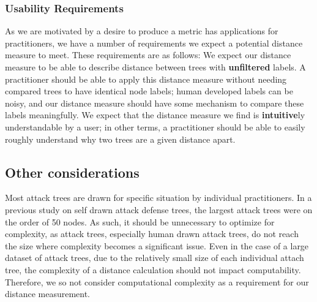 \subsubsection{Usability Requirements}

As we are motivated by a desire to produce a metric has applications for practitioners, we have a number of requirements we expect a potential distance measure to meet. These requirements are as follows:
We expect our distance measure to be able to describe distance between trees with \textbf{unfiltered} labels. A practitioner should be able to apply this distance measure without needing compared trees to have identical node labels; human developed labels can be noisy, and our distance measure should have some mechanism to compare these labels meaningfully. We expect that the distance measure we find is \textbf{intuitive}ly understandable by a user; in other terms, a practitioner should be able to easily roughly understand why two trees are a given distance apart.
















% 



\subsection{Other considerations}

Most attack trees are drawn for specific situation by individual practitioners. In a previous study on self drawn attack defense trees, the largest attack trees were on the order of 50 nodes. As such, it should be unnecessary to optimize for complexity, as attack trees, especially human drawn attack trees, do not reach the size where complexity becomes a significant issue. Even in the case of a large dataset of attack trees, due to the relatively small size of each individual attach tree, the complexity of a distance calculation should not impact computability. Therefore, we so not consider computational complexity as a requirement for our distance measurement.

